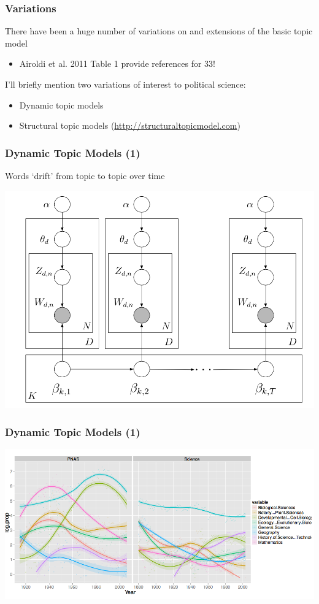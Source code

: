 \documentclass[11pt,compress,professionalfonts]{beamer}
\newcommand{\ita}{\begin{itemize}}
\newcommand{\itm}{\item[]}
\newcommand{\itz}{\end{itemize}}
\begin{document}
\begin{frame}[t]\frametitle{Variations}

There have been a huge number of variations on and extensions of the basic topic model
\ita
\itm Airoldi et al. 2011 Table 1 provide references for 33!
\itz
I'll briefly mention two variations of interest to political science:
\ita
\itm Dynamic topic models
\itm Structural topic models (\url{http://structuraltopicmodel.com})
\itz

\end{frame}
\begin{frame}[t]\frametitle{Dynamic Topic Models (1)}

Words `drift' from topic to topic over time

\centerline{\includegraphics[scale=.8]{pictures/blei-dynamic}}

\end{frame}
\begin{frame}[t]\frametitle{Dynamic Topic Models (1)}

\centerline{\includegraphics[scale=.7]{pictures/dynamics}}

\end{frame}
\end{document}
